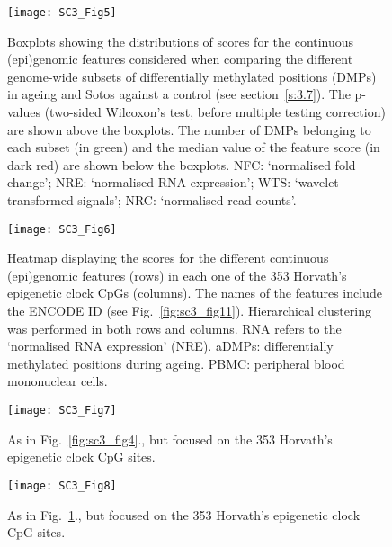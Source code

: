\begin{figure}[htbp!] 
	\centering    
	\texttt{[image: SC3\_Fig5]}
	\caption[Distributions of scores for the continuous (epi)genomic features in Sotos and ageing: genome-wide]{Boxplots showing the distributions of scores for the continuous (epi)genomic features considered when comparing the different genome-wide subsets of differentially methylated positions (DMPs) in ageing and Sotos against a control (see section~\ref{s:3.7}). The p-values (two-sided Wilcoxon's test, before multiple testing correction) are shown above the boxplots. The number of DMPs belonging to each subset (in green) and the median value of the feature score (in dark red) are shown below the boxplots. \acrshort{NFC}: `normalised fold change'; \acrshort{NRE}: `normalised RNA expression'; \acrshort{WTS}: `wavelet-transformed signals'; \acrshort{NRC}: `normalised read counts'.}
	\label{fig:sc3_fig5}
\end{figure}

\begin{figure}[htbp!] 
	\centering    
	\texttt{[image: SC3\_Fig6]}
	\vspace*{1 mm}
	\caption[Scores for the continuous (epi)genomic features in the Horvath's epigenetic clock CpGs]{Heatmap displaying the scores for the different continuous (epi)genomic features (rows) in each one of the 353 Horvath's epigenetic clock CpGs (columns). The names of the features include the ENCODE ID (see Fig.~\ref{fig:sc3_fig11}). Hierarchical clustering was performed in both rows and columns. RNA refers to the `normalised RNA expression' (NRE). aDMPs: differentially methylated positions during ageing. PBMC: peripheral blood mononuclear cells.}
	\label{fig:sc3_fig6}
\end{figure}

\begin{figure}[htbp!] 
	\centering    
	\texttt{[image: SC3\_Fig7]}
	\caption[Enrichment for the categorical (epi)genomic features in Sotos and ageing: Horvath's epigenetic clock]{As in Fig.~\ref{fig:sc3_fig4}., but focused on the 353 Horvath's epigenetic clock CpG sites.}
	\label{fig:sc3_fig7}
\end{figure}

\begin{figure}[htbp!] 
	\centering    
	\texttt{[image: SC3\_Fig8]}
	\caption[Distributions of scores for the continuous (epi)genomic features in Sotos and ageing: Horvath's epigenetic clock]{As in Fig.~\ref{fig:sc3_fig5}., but focused on the 353 Horvath's epigenetic clock CpG sites.}
	\label{fig:sc3_fig8}
\end{figure}

